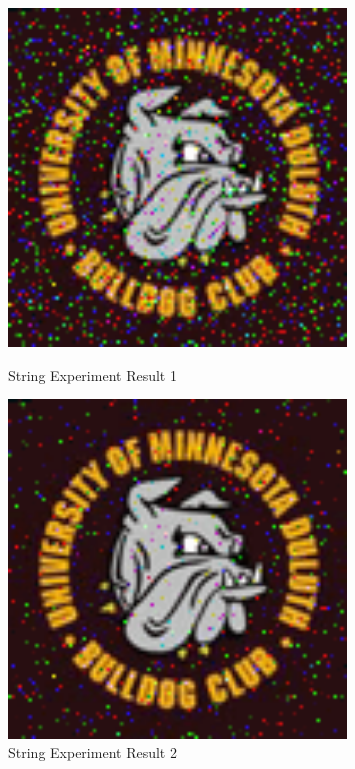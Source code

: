 \documentclass{article}
\begin{document}
\begin{figure}[ht]
    \centering
    \begin{minipage}{0.45\textwidth}
        \centering
        \includegraphics[width=0.8\textwidth]{bulldog000015} %
        \caption{String Experiment Result 1}
    \end{minipage}\hfill
    \begin{minipage}{0.45\textwidth}
        \centering
        \includegraphics[width=0.8\textwidth]{bulldog000021} %
        \caption{String Experiment Result 2}
    \end{minipage}
\end{figure}
\end{document}
